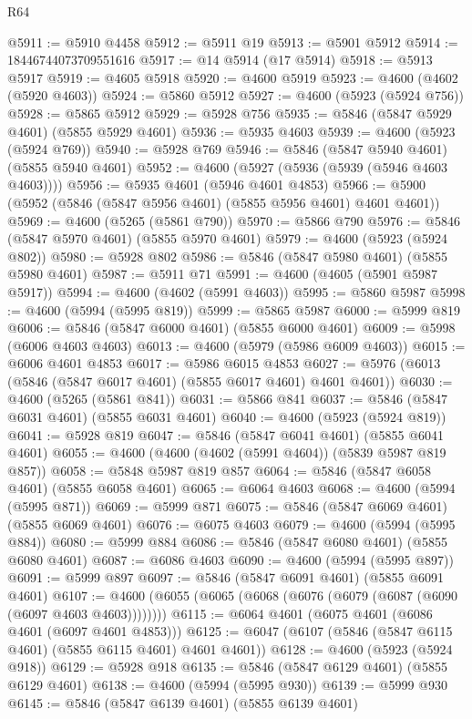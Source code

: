\begin{lexlean}{R64}
\begin{coremodule}
@5911 := @5910 @4458
@5912 := @5911 @19
@5913 := @5901 @5912
@5914 := 18446744073709551616
@5917 := @14 @5914 (@17 @5914)
@5918 := @5913 @5917
@5919 := @4605 @5918
@5920 := @4600 @5919
@5923 := @4600 (@4602 (@5920 @4603))
@5924 := @5860 @5912
@5927 := @4600 (@5923 (@5924 @756))
@5928 := @5865 @5912
@5929 := @5928 @756
@5935 := @5846 (@5847 @5929 @4601) (@5855 @5929 @4601)
@5936 := @5935 @4603
@5939 := @4600 (@5923 (@5924 @769))
@5940 := @5928 @769
@5946 := @5846 (@5847 @5940 @4601) (@5855 @5940 @4601)
@5952 := @4600 (@5927 (@5936 (@5939 (@5946 @4603 @4603))))
@5956 := @5935 @4601 (@5946 @4601 @4853)
@5966 := @5900 (@5952 (@5846 (@5847 @5956 @4601) (@5855 @5956 @4601) @4601 @4601))
@5969 := @4600 (@5265 (@5861 @790))
@5970 := @5866 @790
@5976 := @5846 (@5847 @5970 @4601) (@5855 @5970 @4601)
@5979 := @4600 (@5923 (@5924 @802))
@5980 := @5928 @802
@5986 := @5846 (@5847 @5980 @4601) (@5855 @5980 @4601)
@5987 := @5911 @71
@5991 := @4600 (@4605 (@5901 @5987 @5917))
@5994 := @4600 (@4602 (@5991 @4603))
@5995 := @5860 @5987
@5998 := @4600 (@5994 (@5995 @819))
@5999 := @5865 @5987
@6000 := @5999 @819
@6006 := @5846 (@5847 @6000 @4601) (@5855 @6000 @4601)
@6009 := @5998 (@6006 @4603 @4603)
@6013 := @4600 (@5979 (@5986 @6009 @4603))
@6015 := @6006 @4601 @4853
@6017 := @5986 @6015 @4853
@6027 := @5976 (@6013 (@5846 (@5847 @6017 @4601) (@5855 @6017 @4601) @4601 @4601))
@6030 := @4600 (@5265 (@5861 @841))
@6031 := @5866 @841
@6037 := @5846 (@5847 @6031 @4601) (@5855 @6031 @4601)
@6040 := @4600 (@5923 (@5924 @819))
@6041 := @5928 @819
@6047 := @5846 (@5847 @6041 @4601) (@5855 @6041 @4601)
@6055 := @4600 (@4600 (@4602 (@5991 @4604)) (@5839 @5987 @819 @857))
@6058 := @5848 @5987 @819 @857
@6064 := @5846 (@5847 @6058 @4601) (@5855 @6058 @4601)
@6065 := @6064 @4603
@6068 := @4600 (@5994 (@5995 @871))
@6069 := @5999 @871
@6075 := @5846 (@5847 @6069 @4601) (@5855 @6069 @4601)
@6076 := @6075 @4603
@6079 := @4600 (@5994 (@5995 @884))
@6080 := @5999 @884
@6086 := @5846 (@5847 @6080 @4601) (@5855 @6080 @4601)
@6087 := @6086 @4603
@6090 := @4600 (@5994 (@5995 @897))
@6091 := @5999 @897
@6097 := @5846 (@5847 @6091 @4601) (@5855 @6091 @4601)
@6107 := @4600 (@6055 (@6065 (@6068 (@6076 (@6079 (@6087 (@6090 (@6097 @4603 @4603))))))))
@6115 := @6064 @4601 (@6075 @4601 (@6086 @4601 (@6097 @4601 @4853)))
@6125 := @6047 (@6107 (@5846 (@5847 @6115 @4601) (@5855 @6115 @4601) @4601 @4601))
@6128 := @4600 (@5923 (@5924 @918))
@6129 := @5928 @918
@6135 := @5846 (@5847 @6129 @4601) (@5855 @6129 @4601)
@6138 := @4600 (@5994 (@5995 @930))
@6139 := @5999 @930
@6145 := @5846 (@5847 @6139 @4601) (@5855 @6139 @4601)

\end{coremodule}
\end{lexlean}
